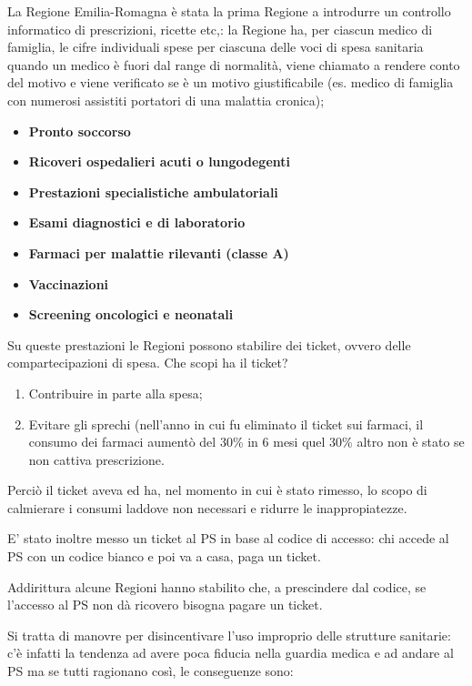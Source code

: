 \documentclass[]{article}
\begin{document}
La Regione Emilia-Romagna è stata la prima Regione a introdurre un
controllo informatico di prescrizioni, ricette etc,: la Regione ha, per
ciascun medico di famiglia, le cifre individuali spese per ciascuna
delle voci di spesa sanitaria quando un medico è fuori dal range di
normalità, viene chiamato a rendere conto del motivo e viene verificato
se è un motivo giustificabile (es. medico di famiglia con numerosi
assistiti portatori di una malattia cronica);

\begin{itemize}
\item
  \textbf{Pronto soccorso}
\item
  \textbf{Ricoveri ospedalieri acuti o lungodegenti}
\item
  \textbf{Prestazioni specialistiche ambulatoriali}
\item
  \textbf{Esami diagnostici e di laboratorio}
\item
  \textbf{Farmaci per malattie rilevanti (classe A)}
\item
  \textbf{Vaccinazioni}
\item
  \textbf{Screening oncologici e neonatali}
\end{itemize}

Su queste prestazioni le Regioni possono stabilire dei ticket, ovvero
delle compartecipazioni di spesa. Che scopi ha il ticket?

\begin{enumerate}
\def\labelenumi{\arabic{enumi}.}
\item
  Contribuire in parte alla spesa;
\item
  Evitare gli sprechi (nell'anno in cui fu eliminato il ticket sui
  farmaci, il consumo dei farmaci aumentò del 30\% in 6 mesi quel 30\%
  altro non è stato se non cattiva prescrizione.
\end{enumerate}

Perciò il ticket aveva ed ha, nel momento in cui è stato rimesso, lo
scopo di calmierare i consumi laddove non necessari e ridurre le
inappropiatezze.

E' stato inoltre messo un ticket al PS in base al codice di accesso: chi
accede al PS con un codice bianco e poi va a casa, paga un ticket.

Addirittura alcune Regioni hanno stabilito che, a prescindere dal
codice, se l'accesso al PS non dà ricovero bisogna pagare un ticket.

Si tratta di manovre per disincentivare l'uso improprio delle strutture
sanitarie: c'è infatti la tendenza ad avere poca fiducia nella guardia
medica e ad andare al PS ma se tutti ragionano così, le conseguenze
sono:
\end{document}
